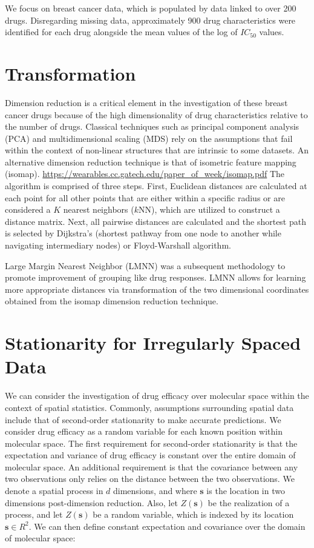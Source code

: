 \documentclass[print]{nuthesis}
\begin{document}
We focus on breast cancer data, which is populated by data linked to over 200 drugs. Disregarding missing data, approximately 900 drug characteristics were identified for each drug alongside the mean values of the log of \(IC_\text{50}\) values.

\hypertarget{transformation}{%
\section{Transformation}\label{transformation}}

Dimension reduction is a critical element in the investigation of these breast cancer drugs because of the high dimensionality of drug characteristics relative to the number of drugs. Classical techniques such as principal component analysis (PCA) and multidimensional scaling (MDS) rely on the assumptions that fail within the context of non-linear structures that are intrinsic to some datasets. An alternative dimension reduction technique is that of isometric feature mapping (isomap). \url{https://wearables.cc.gatech.edu/paper_of_week/isomap.pdf} The algorithm is comprised of three steps. First, Euclidean distances are calculated at each point for all other points that are either within a specific radius or are considered a \(K\) nearest neighbors (\(k\)NN), which are utilized to construct a distance matrix. Next, all pairwise distances are calculated and the shortest path is selected by Dijkstra's (shortest pathway from one node to another while navigating intermediary nodes) or Floyd-Warshall algorithm.

Large Margin Nearest Neighbor (LMNN) was a subsequent methodology to promote improvement of grouping like drug responses. LMNN allows for learning more appropriate distances via transformation of the two dimensional coordinates obtained from the isomap dimension reduction technique.

\hypertarget{stationarity-for-irregularly-spaced-data}{%
\section{Stationarity for Irregularly Spaced Data}\label{stationarity-for-irregularly-spaced-data}}

We can consider the investigation of drug efficacy over molecular space within the context of spatial statistics. Commonly, assumptions surrounding spatial data include that of second-order stationarity to make accurate predictions. We consider drug efficacy as a random variable for each known position within molecular space. The first requirement for second-order stationarity is that the expectation and variance of drug efficacy is constant over the entire domain of molecular space. An additional requirement is that the covariance between any two observations only relies on the distance between the two observations. We denote a spatial process in \(d\) dimensions, and where \(\textbf{s}\) is the location in two dimensions post-dimension reduction. Also, let \(Z(\textbf{s})\) be the realization of a process, and let \(Z(\textbf{s})\) be a random variable, which is indexed by its location \(\textbf{s} \in R^\text{2}\). We can then define constant expectation and covariance over the domain of molecular space:
\end{document}
